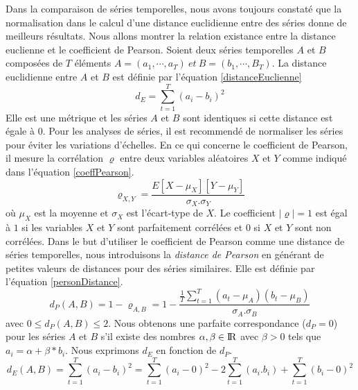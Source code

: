 Dans la comparaison de s\'eries temporelles, nous avons toujours constat\'e que la normalisation dans le calcul d'une distance euclidienne entre des s\'eries donne de meilleurs r\'esultats.
Nous allons montrer la relation existance entre la distance euclienne et le coefficient de Pearson.
\newline
Soient deux s\'eries temporelles $A$ et $B$ compos\'ees de $T$ \'el\'ements $A=(a_1, \cdots, a_T) ~et~ B=(b_1, \cdots, B_T)$.
La distance euclidienne entre  $A$ et $B$ est d\'efinie par l'\'equation \ref{distanceEuclienne}
\begin{equation}
\label{distanceEuclienne}
d_E = \sum_{t=1}^{T}(a_i - b_i)^{2}
\end{equation}
Elle est une m\'etrique et les s\'eries $A$ et $B$ sont identiques si cette distance est \'egale \`a $0$. Pour les analyses de s\'eries, il est recommend\'e de normaliser les s\'eries pour \'eviter les variations d'\'echelles.
En ce qui concerne le coefficient de Pearson, il mesure la corr\'elation $\varrho$  entre deux variables al\'eatoires $X$ et $Y$ comme indiqu\'e dans l'\'equation \ref{coeffPearson}.
\begin{equation}
\label{coeffPearson}
 \varrho_{X,Y} = \frac{ E[X - \mu_{X}][ Y - \mu_{Y}] }{\sigma_X . \sigma_Y} 
\end{equation}
o\`u $\mu_{X}$ est la moyenne  et $\sigma_{X}$ est l'\'ecart-type de $X$.
Le coefficient $|\varrho| = 1$ est \'egal \`a  
$1$ si les variables $X$ et $Y$ sont parfaitement corr\'el\'ees et 
$0$ si $X$ et $Y$ sont non corr\'el\'ees.
\newline
Dans le but d'utiliser le coefficient de Pearson comme une distance de s\'eries temporelles, nous introduisons la {\em distance de Pearson} en g\'en\'erant de petites valeurs de distances pour des s\'eries similaires. %
Elle est d\'efinie par l'\'equation \ref{personDistance}.
\begin{equation}
\label{personDistance}
d_{P}(A,B) = 1 - \varrho_{A,B}= 1- \frac{ \frac{1}{T} \sum_{t=1}^{T} (a_t - \mu_A)(b_t - \mu_B) }{\sigma_A . \sigma_B}
\end{equation}
avec $0 \le d_P{(A,B)} \le 2$.
Nous obtenons une parfaite correspondance ($d_P = 0$) pour les s\'eries $A$ et $B$ s'il existe des nombres $\alpha, \beta \in \mbox{I\hspace{-.15em}R}$ avec $\beta>0$ tels que $a_i = \alpha + \beta * b_i$.
Nous exprimons $d_E$ en fonction de $d_P$.
\begin{equation}
\label{demontrationPearson}
d_E(A,B) = \sum_{t=1}^{T}(a_i - b_i)^{2}
=  \sum_{t=1}^{T}(a_i - 0)^{2} -2 \sum_{t=1}^{T}(a_i . b_i) + \sum_{t=1}^{T}(b_i - 0)^{2}
\end{equation}
